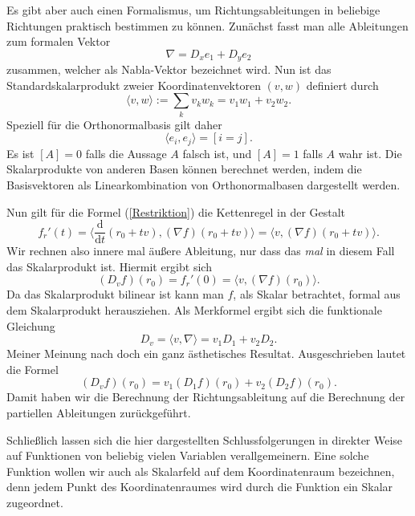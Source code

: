 \documentclass[a4paper,12pt,fleqn]{article}
\begin{document}
Es gibt aber auch einen Formalismus, um Richtungsableitungen
in beliebige Richtungen praktisch bestimmen zu können.
Zunächst fasst man alle Ableitungen zum formalen Vektor
\begin{equation}
\nabla = D_x e_1+D_y e_2
\end{equation}
zusammen, welcher als Nabla-Vektor bezeichnet wird. Nun ist das
Standardskalarprodukt zweier Koordinatenvektoren $(v,w)$ definiert
durch
\begin{equation}
\langle v,w\rangle := \sum_k v_k w_k = v_1 w_1+v_2 w_2.
\end{equation}
Speziell für die Orthonormalbasis gilt daher
\begin{equation}
\langle e_i,e_j\rangle = [i=j].
\end{equation}
Es ist $[A]=0$ falls die Aussage $A$ falsch ist, und $[A]=1$
falls $A$ wahr ist. Die Skalarprodukte von anderen Basen können
berechnet werden, indem die Basisvektoren als Linearkombination
von Orthonormalbasen dargestellt werden.

Nun gilt für die Formel (\ref{Restriktion}) die Kettenregel
in der Gestalt
\begin{equation}
f_r'(t) = \langle\frac{\mathrm d}{\mathrm dt}(r_0+tv),
(\nabla f)(r_0+tv)\rangle
= \langle v,(\nabla f)(r_0+tv)\rangle.
\end{equation}
Wir rechnen also innere mal äußere Ableitung, nur dass das
\textit{mal} in diesem Fall das Skalarprodukt ist. Hiermit ergibt
sich
\begin{equation}
(D_v f)(r_0) = f_r'(0) = \langle v,(\nabla f)(r_0)\rangle.
\end{equation}
Da das Skalarprodukt bilinear ist kann man $f$, als Skalar
betrachtet, formal aus dem Skalarprodukt herausziehen.
Als Merkformel ergibt sich die funktionale Gleichung
\begin{equation}\label{Richtungsableitung}
D_v = \langle v,\nabla\rangle = v_1D_1+v_2D_2.
\end{equation}
Meiner Meinung nach doch ein ganz ästhetisches Resultat.
Ausgeschrieben lautet die Formel
\begin{equation}\label{RAexpandiert}
(D_v f)(r_0) = v_1(D_1 f)(r_0)+ v_2(D_2 f)(r_0).
\end{equation}
Damit haben wir die Berechnung der Richtungsableitung auf
die Berechnung der partiellen Ableitungen zurückgeführt.

Schließlich lassen sich die hier dargestellten Schlussfolgerungen
in direkter Weise auf Funktionen von beliebig vielen Variablen
verallgemeinern. Eine solche Funktion wollen wir auch als Skalarfeld
auf dem Koordinatenraum bezeichnen, denn jedem Punkt des
Koordinatenraumes wird durch die Funktion ein Skalar zugeordnet.
\end{document}

